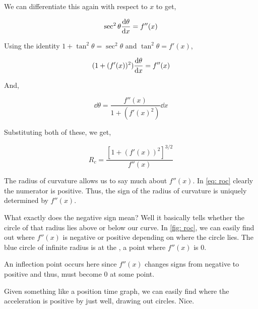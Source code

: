 We can differentiate this again with respect to \(x\) to get,

\begin{equation*}
    \sec^2\theta \dv{\theta}{x} = f''(x)
\end{equation*}


Using the identity \(1 + \tan^2\theta = \sec^2 \theta\) and \(\tan^2 \theta = f'(x)\),

\begin{equation*}
    (1 + (f'(x))^2) \dv{\theta}{x} = f''(x)
\end{equation*}

And, 

\begin{equation*}
    \dd{\theta} = \frac{f''(x)}{1 + (f'(x)^2)} \dd{x}
\end{equation*}

Substituting both of these, we get, 

\begin{equation}
    \label{eq: roc}
    \boxed{R_c = \frac{[1 + (f'(x))^2]^{3/2}}{f''(x)}}
\end{equation}


The radius of curvature allows us to say much about \(f''(x)\). In \eqref{eq: roc} 
clearly the numerator is positive. Thus, the sign of the radius of curvature is uniquely determined 
by \(f''(x)\). 

What exactly does the negative sign mean? Well it basically tells whether the circle of 
that radius lies above or below our curve. In \cref{fig: roc}, we 
can easily find out where \(f''(x)\) is negative or 
positive depending on where the circle lies. The blue circle of infinite radius 
is at the , a point where \(f''(x)\) is \(0\). 

An inflection point occurs here since \(f''(x)\) changes signs from negative to positive
and thus, must become \(0\) at some point.

Given something like a position time graph, 
we can easily find where the acceleration is positive by just well, drawing out circles.
Nice.


